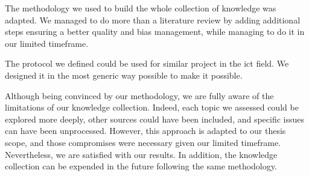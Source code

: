 The methodology we used to build the whole collection of knowledge was adapted. We managed to do more than a literature review by adding additional steps ensuring a better quality and bias management, while managing to do it in our limited timeframe.

The protocol we defined could be used for similar project in the \gls{ict} field. We designed it in the most generic way possible to make it possible.

Although being convinced by our methodology, we are fully aware of the limitations of our knowledge collection. Indeed, each topic we assessed could be explored more deeply, other sources could have been included, and specific issues can have been unprocessed. However, this approach is adapted to our thesis scope, and those compromises were necessary given our limited timeframe. Nevertheless, we are satisfied with our results. In addition, the knowledge collection can be expended in the future following the same methodology.